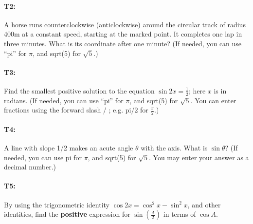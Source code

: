 \documentclass[pdftex, brazil, 12pt, twoside]{article}
\begin{document}
\paragraph{T2:} A horse runs counterclockwise (anticlockwise) around the circular track of radius 400m at a constant speed, starting at the marked point. It completes one lap in three minutes. What is its coordinate after one minute? (If needed, you can use ``pi'' for $\pi$, and sqrt(5) for $\sqrt{5}$.)

\begin{figure}[H]
  \begin{center}
    \label{fig:adv-t2}
  \end{center}
\end{figure}

\paragraph{T3:} Find the smallest positive solution to the equation $\sin{2x} = \frac{1}{2}$; here $x$ is in radians.
(If needed, you can use ``pi'' for $\pi$, and sqrt(5) for $\sqrt{5}$. You can enter fractions using the forward slash
/ ; e.g. pi/2 for $\frac{\pi}{2}$.)

\paragraph{T4:} A line with slope 1/2 makes an acute angle $\theta$ with the axis. What is $\sin{\theta}$?
(If needed, you can use pi for $\pi$, and sqrt(5) for $\sqrt{5}$. You may enter your answer as a decimal number.)

\paragraph{T5:} By using the trigonometric identity $\cos{2x} = \cos^2{x} - \sin^2{x}$, and other identities,
find the \textbf{positive} expression for $\sin{\left(\frac{A}{2}\right)}$ in terms of $\cos{A}$.
\end{document}
